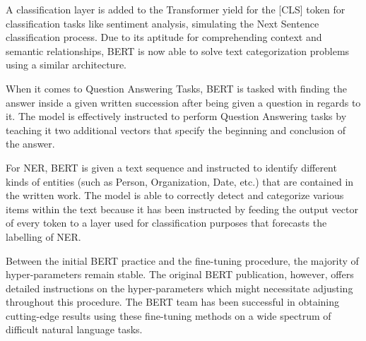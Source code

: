 A classification layer is added to the Transformer yield for the [CLS] token for classification tasks like sentiment analysis, simulating the Next Sentence classification process. Due to its aptitude for comprehending context and semantic relationships, BERT is now able to solve text categorization problems using a similar architecture.


When it comes to Question Answering Tasks, BERT is tasked with finding the answer inside a given written succession after being given a question in regards to it. The model is effectively instructed to perform Question Answering tasks by teaching it two additional vectors that specify the beginning and conclusion of the answer.

For NER, BERT is given a text sequence and instructed to identify different kinds of entities (such as Person, Organization, Date, etc.) that are contained in the written work. The model is able to correctly detect and categorize various items within the text because it has been instructed by feeding the output vector of every token to a layer used for classification purposes that forecasts the labelling of NER.



Between the initial BERT practice and the fine-tuning procedure, the majority of hyper-parameters remain stable. The original BERT publication, however, offers detailed instructions on the hyper-parameters which might necessitate adjusting throughout this procedure. The BERT team has been successful in obtaining cutting-edge results using these fine-tuning methods on a wide spectrum of difficult natural language tasks.





